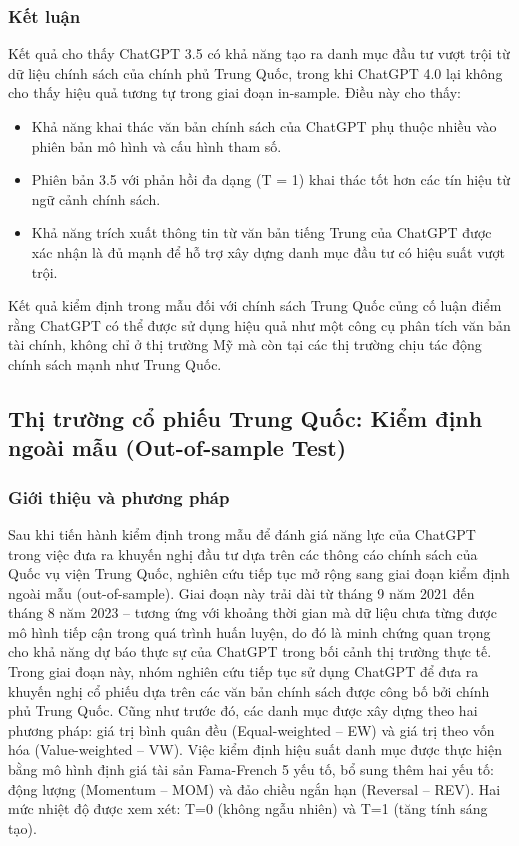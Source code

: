 \documentclass[a4paper,12pt]{article}
\begin{document}
\subsubsection{Kết luận}
Kết quả cho thấy ChatGPT 3.5 có khả năng tạo ra danh mục đầu tư vượt trội từ dữ liệu chính sách của chính phủ Trung Quốc, trong khi ChatGPT 4.0 lại không cho thấy hiệu quả tương tự trong giai đoạn in-sample. Điều này cho thấy:

\begin{itemize}
    \item Khả năng khai thác văn bản chính sách của ChatGPT phụ thuộc nhiều vào phiên bản mô hình và cấu hình tham số.
    \item Phiên bản 3.5 với phản hồi đa dạng (T = 1) khai thác tốt hơn các tín hiệu từ ngữ cảnh chính sách.
    \item Khả năng trích xuất thông tin từ văn bản tiếng Trung của ChatGPT được xác nhận là đủ mạnh để hỗ trợ xây dựng danh mục đầu tư có hiệu suất vượt trội.
\end{itemize}
\noindent
Kết quả kiểm định trong mẫu đối với chính sách Trung Quốc củng cố luận điểm rằng ChatGPT có thể được sử dụng hiệu quả như một công cụ phân tích văn bản tài chính, không chỉ ở thị trường Mỹ mà còn tại các thị trường chịu tác động chính sách mạnh như Trung Quốc.

\subsection{Thị trường cổ phiếu Trung Quốc: Kiểm định ngoài mẫu (Out-of-sample Test)}

\subsubsection{Giới thiệu và phương pháp}

Sau khi tiến hành kiểm định trong mẫu để đánh giá năng lực của ChatGPT trong việc đưa ra khuyến nghị đầu tư dựa trên các thông cáo chính sách của Quốc vụ viện Trung Quốc, nghiên cứu tiếp tục mở rộng sang giai đoạn kiểm định ngoài mẫu (out-of-sample). Giai đoạn này trải dài từ tháng 9 năm 2021 đến tháng 8 năm 2023 – tương ứng với khoảng thời gian mà dữ liệu chưa từng được mô hình tiếp cận trong quá trình huấn luyện, do đó là minh chứng quan trọng cho khả năng dự báo thực sự của ChatGPT trong bối cảnh thị trường thực tế.
\\Trong giai đoạn này, nhóm nghiên cứu tiếp tục sử dụng ChatGPT để đưa ra khuyến nghị cổ phiếu dựa trên các văn bản chính sách được công bố bởi chính phủ Trung Quốc. Cũng như trước đó, các danh mục được xây dựng theo hai phương pháp: giá trị bình quân đều (Equal-weighted – EW) và giá trị theo vốn hóa (Value-weighted – VW). Việc kiểm định hiệu suất danh mục được thực hiện bằng mô hình định giá tài sản Fama-French 5 yếu tố, bổ sung thêm hai yếu tố: động lượng (Momentum – MOM) và đảo chiều ngắn hạn (Reversal – REV). Hai mức nhiệt độ được xem xét: T=0 (không ngẫu nhiên) và T=1 (tăng tính sáng tạo).
\end{document}
